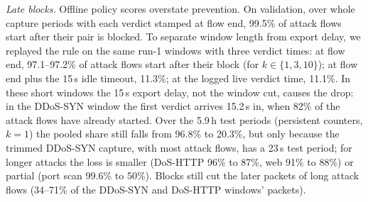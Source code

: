 \emph{Late blocks.} Offline policy scores overstate prevention. On validation, over whole capture periods with each verdict stamped at flow end, 99.5\% of attack flows start after their pair is blocked. To separate window length from export delay, we replayed the rule on the same run-1 windows with three verdict times: at flow end, 97.1--97.2\% of attack flows start after their block (for $k\in\{1,3,10\}$); at flow end plus the 15\,s idle timeout, 11.3\%; at the logged live verdict time, 11.1\%. In these short windows the 15\,s export delay, not the window cut, causes the drop: in the DDoS-SYN window the first verdict arrives 15.2\,s in, when 82\% of the attack flows have already started. Over the 5.9\,h test periods (persistent counters, $k=1$) the pooled share still falls from 96.8\% to 20.3\%, but only because the trimmed DDoS-SYN capture, with most attack flows, has a 23\,s test period; for longer attacks the loss is smaller (DoS-HTTP 96\% to 87\%, web 91\% to 88\%) or partial (port scan 99.6\% to 50\%). Blocks still cut the later packets of long attack flows (34--71\% of the DDoS-SYN and DoS-HTTP windows' packets).
